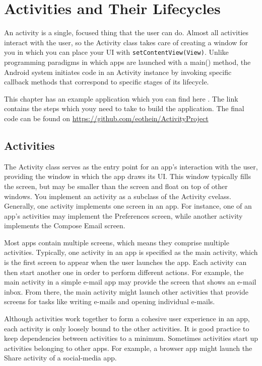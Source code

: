 

\chapter{Activities and Their Lifecycles}
An activity is a single, focused thing that the user can do.
Almost all activities interact with the user, so the Activity class takes care of creating a window for you in which you can place your UI with \texttt{setContentView(View)}. 
Unlike programming paradigms in which apps are launched with a main() method, the Android system initiates code in an Activity instance by invoking specific callback methods that correspond to specific stages of its lifecycle.
	
\begin{framed}
	This chapter has an example application which you can find here \cite{GoogleDevelopers2018}.
	The link contains the steps which youy need to take to build the application.
	The final code can be found on \url{https://github.com/eothein/ActivityProject}	
\end{framed}


\section{Activities}
The Activity class serves as the entry point for an app’s interaction with the user, providing the window in which the app draws its UI.
This window typically fills the screen, but may be smaller than the screen and float on top of other windows.
You implement an activity as a subclass of the Activity cvelass.
Generally, one activity implements one screen in an app.
For instance, one of an app’s activities may implement the Preferences screen, while another activity implements the Compose Email screen.

Most apps contain multiple screens, which means they comprise multiple activities.
Typically, one activity in an app is specified as the main activity, which is the first screen to appear when the user launches the app.
Each activity can then start another one in order to perform different actions.
For example, the main activity in a simple e-mail app may provide the screen that shows an e-mail inbox.
From there, the main activity might launch other activities that provide screens for tasks like writing e-mails and opening individual e-mails.

Although activities work together to form a cohesive user experience in an app, each activity is only loosely bound to the other activities.
It is good practice to keep dependencies between activities to a minimum.
Sometimes activities start up activities belonging to other apps.
For example, a browser app might launch the Share activity of a social-media app.


